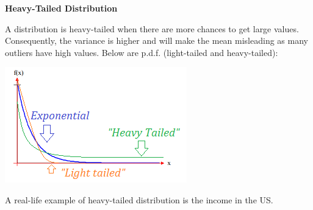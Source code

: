 {\fontsize{12pt}{22pt} \textbf{Heavy-Tailed Distribution}\par}

\vspace{5mm}

A distribution is heavy-tailed when there are more chances to get large values. Consequently, the variance is higher and will make the mean misleading as many outliers have high values. Below are p.d.f. (light-tailed and heavy-tailed):

\vspace{5mm}

\begin{center}
\includegraphics[scale=0.8]{heavy-light-tailed.png}
\end{center}

A real-life example of heavy-tailed distribution is the income in the US.

\vspace{5mm}